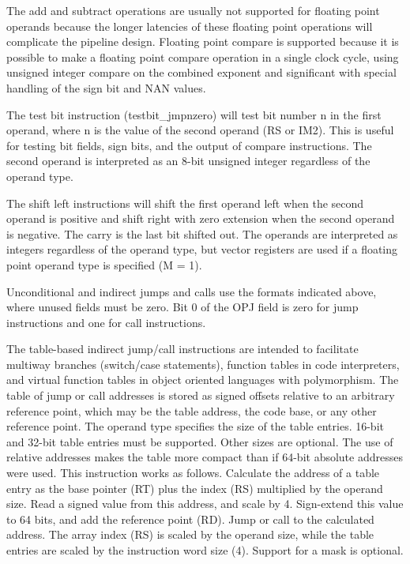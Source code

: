 \documentclass[forwardcom.tex]{subfiles}
\begin{document}
The add and subtract operations are usually not supported for floating point operands because the longer latencies of these floating point operations will complicate the pipeline design. Floating point compare is supported because it is possible to make a floating point compare operation in a single clock cycle, using unsigned integer compare on the combined exponent and significant with special handling of the sign bit and NAN values.
\vspace{2mm}

The test bit instruction (testbit\_jmpnzero) will test bit number n in the first operand, where n is the value of the second operand (RS or IM2). This is useful for testing bit fields, sign bits, and the output of compare instructions. The second operand is interpreted as an 8-bit unsigned integer regardless of the operand type.
\vspace{2mm}

The shift left instructions will shift the first operand left when the second operand is positive and shift right with zero extension when the second operand is negative. The carry is the last bit shifted out. The operands are interpreted as integers regardless of the operand type, but vector registers are used if a floating point operand type is specified (M = 1).
\vspace{2mm}

Unconditional and indirect jumps and calls use the formats indicated above, where unused fields must be zero. Bit 0 of the OPJ field is zero for jump instructions and one for call instructions.
\vspace{2mm}

\label{jumpTableInstruction}
The table-based indirect jump/call instructions are intended to facilitate multiway branches (switch/case statements), function tables in code interpreters, and virtual function tables in object oriented languages with polymorphism. The table of jump or call addresses is stored as signed offsets relative to an arbitrary reference point, which may be the table address, the code base, or any other reference point. The operand type specifies the size of the table entries. 16-bit and 32-bit table entries must be supported. Other sizes are optional. The use of relative addresses makes the table more compact than if 64-bit absolute addresses were used. This instruction works as follows. Calculate the address of a table entry as the base pointer (RT) plus the index (RS) multiplied by the operand size. Read a signed value from this address, and scale by 4. Sign-extend this value to 64 bits, and add the reference point (RD). Jump or call to the calculated address. The array index (RS) is scaled by the operand size, while the table entries are scaled by the instruction word size (4). Support for a mask is optional.
\vspace{2mm}
\end{document}

